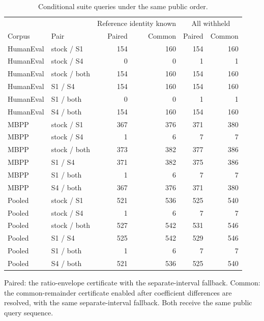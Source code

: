 \begin{table}[t]
\centering
\caption{Conditional suite queries under the same public order.}
\label{tab:paired-all-comparisons}
\small
\begin{tabular}{@{}llrrrr@{}}
\toprule
 & & \multicolumn{2}{c}{Reference identity known} & \multicolumn{2}{c}{All withheld} \\
Corpus & Pair & Paired & Common & Paired & Common \\
\midrule
HumanEval & stock / S1 & 154 & 160 & 154 & 160 \\
HumanEval & stock / S4 & 0 & 0 & 1 & 1 \\
HumanEval & stock / both & 154 & 160 & 154 & 160 \\
HumanEval & S1 / S4 & 154 & 160 & 154 & 160 \\
HumanEval & S1 / both & 0 & 0 & 1 & 1 \\
HumanEval & S4 / both & 154 & 160 & 154 & 160 \\
MBPP & stock / S1 & 367 & 376 & 371 & 380 \\
MBPP & stock / S4 & 1 & 6 & 7 & 7 \\
MBPP & stock / both & 373 & 382 & 377 & 386 \\
MBPP & S1 / S4 & 371 & 382 & 375 & 386 \\
MBPP & S1 / both & 1 & 6 & 7 & 7 \\
MBPP & S4 / both & 367 & 376 & 371 & 380 \\
Pooled & stock / S1 & 521 & 536 & 525 & 540 \\
Pooled & stock / S4 & 1 & 6 & 7 & 7 \\
Pooled & stock / both & 527 & 542 & 531 & 546 \\
Pooled & S1 / S4 & 525 & 542 & 529 & 546 \\
Pooled & S1 / both & 1 & 6 & 7 & 7 \\
Pooled & S4 / both & 521 & 536 & 525 & 540 \\
\bottomrule
\end{tabular}
\par\smallskip\begin{minipage}{\linewidth}\footnotesize Paired: the ratio-envelope certificate with the separate-interval fallback. Common: the common-remainder certificate enabled after coefficient differences are resolved, with the same separate-interval fallback. Both receive the same public query sequence.\end{minipage}
\end{table}
